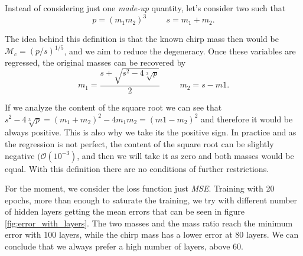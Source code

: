\documentclass[prd,aps,twocolumn,a4paper,showkeys,nofootinbib]{article}
\begin{document}
Instead of considering just one \textit{made-up} quantity, let's consider two such that
\begin{equation}
p=(m_1m_2)^3 \hspace{1cm} s=m_1+m_2.
\end{equation} 

The idea behind this definition is that the known chirp mass then would be $\mathcal{M}_c=(p/s)^{1/5}$, and we aim to reduce the degeneracy. Once these variables are regressed, the original masses can be recovered by
\begin{equation}
m_1=\frac{s+\sqrt{s^2-4\sqrt[3]{p}}}{2} \hspace{1cm} m_2=s-m1.
\end{equation}

If we analyze the content of the square root we can see that $s^2-4\sqrt[3]{p}=(m_1+m_2)^2-4m_1m_2=(m1-m_2)^2$ and therefore it would be always positive. This is also why we take its the positive sign. In practice and as the regression is not perfect, the content of the square root can be slightly negative $(\mathcal{O}(10^{-3})$, and then we will take it as zero and both masses would be equal. With this definition there are no conditions of further restrictions.

For the moment, we consider the loss function just \textit{MSE}. Training with 20 epochs, more than enough to saturate the training, we try with different number of hidden layers getting the mean errors that can be seen in figure \ref{fig:error_with_layers}. The two masses and the mass ratio reach the minimum error with 100 layers, while the chirp mass has a lower error at 80 layers. We can conclude that we always prefer a high number of layers, above 60.
\end{document}
